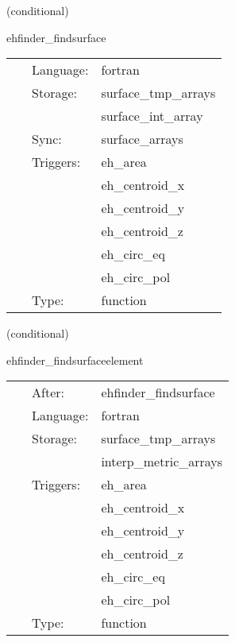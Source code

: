 \vspace{5mm}

   (conditional) 

\hspace{5mm} ehfinder\_findsurface 

\hspace{5mm}{\it find surface } 


\hspace{5mm}

 \begin{tabular*}{160mm}{cll} 
~ & Language:  & fortran \\ 
~ & Storage:  & surface\_tmp\_arrays \\ 
~& ~ &surface\_int\_array\\ 
~ & Sync:  & surface\_arrays \\ 
~ & Triggers:  & eh\_area \\ 
~& ~ &eh\_centroid\_x\\ 
~& ~ &eh\_centroid\_y\\ 
~& ~ &eh\_centroid\_z\\ 
~& ~ &eh\_circ\_eq\\ 
~& ~ &eh\_circ\_pol\\ 
~ & Type:  & function \\ 
\end{tabular*} 


\vspace{5mm}

   (conditional) 

\hspace{5mm} ehfinder\_findsurfaceelement 

\hspace{5mm}{\it find surface area element } 


\hspace{5mm}

 \begin{tabular*}{160mm}{cll} 
~ & After:  & ehfinder\_findsurface \\ 
~ & Language:  & fortran \\ 
~ & Storage:  & surface\_tmp\_arrays \\ 
~& ~ &interp\_metric\_arrays\\ 
~ & Triggers:  & eh\_area \\ 
~& ~ &eh\_centroid\_x\\ 
~& ~ &eh\_centroid\_y\\ 
~& ~ &eh\_centroid\_z\\ 
~& ~ &eh\_circ\_eq\\ 
~& ~ &eh\_circ\_pol\\ 
~ & Type:  & function \\ 
\end{tabular*} 


